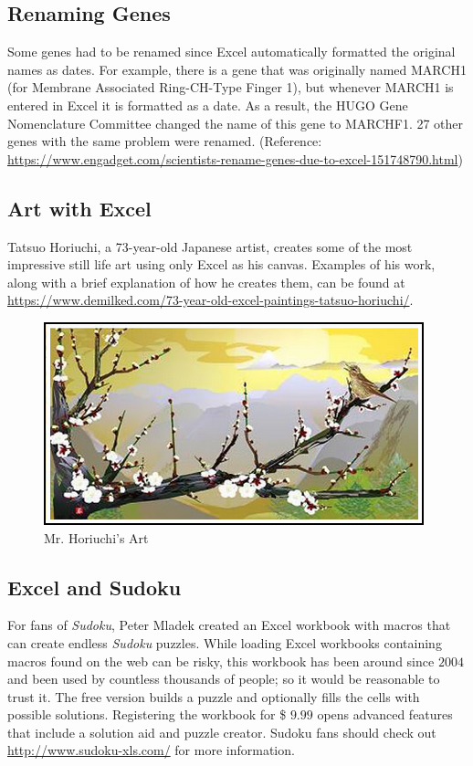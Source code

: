 \subsection{Renaming Genes}

Some genes had to be renamed since Excel automatically formatted the original names as dates. For example, there is a gene that was originally named MARCH1 (for Membrane Associated Ring-CH-Type Finger 1), but whenever MARCH1 is entered in Excel it is formatted as a date. As a result, the HUGO Gene Nomenclature Committee changed the name of this gene to MARCHF1. 27 other genes with the same problem were renamed. (Reference: \url{https://www.engadget.com/scientists-rename-genes-due-to-excel-151748790.html})

\subsection{Art with Excel}

Tatsuo Horiuchi, a 73-year-old Japanese artist, creates some of the most impressive still life art using only Excel as his canvas. Examples of his work, along with a brief explanation of how he creates them, can be found at \url{https://www.demilked.com/73-year-old-excel-paintings-tatsuo-horiuchi/}. 

\begin{figure}[H]
	\centering
	\includegraphics[width=\maxwidth{.75\linewidth}]{gfx/ch09_fig69}
	\caption{Mr. Horiuchi's Art}
	\label{09:fig69}
\end{figure}

\subsection{Excel and Sudoku}

For fans of \textit{Sudoku}, Peter Mladek created an Excel workbook with macros that can create endless \textit{Sudoku} puzzles. While loading Excel workbooks containing macros found on the web can be risky, this workbook has been around since $ 2004 $ and been used by countless thousands of people; so it would be reasonable to trust it. The free version builds a puzzle and optionally fills the cells with possible solutions. Registering the workbook for \$ $ 9.99 $ opens advanced features that include a solution aid and puzzle creator. Sudoku fans should check out \url{http://www.sudoku-xls.com/} for more information.

